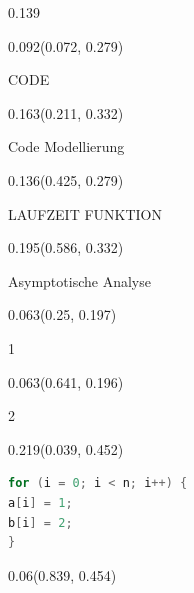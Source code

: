 \documentclass[aspectratio=169]{beamer}
\begin{document}
\begin{frame}[fragile]
\begin{textblock}{0.139}
\end{textblock}
\begin{textblock}{0.092}(0.072, 0.279)
  \begin{minipage}[t][0.161\paperheight]{\linewidth}
    \tiny
    CODE
  \end{minipage}
\end{textblock}
\begin{textblock}{0.163}(0.211, 0.332)
  \begin{minipage}[t][0.054\paperheight]{\linewidth}
    \tiny
    Code Modellierung
  \end{minipage}
\end{textblock}
\begin{textblock}{0.136}(0.425, 0.279)
  \begin{minipage}[t][0.161\paperheight]{\linewidth}
    \tiny
    LAUFZEIT FUNKTION
  \end{minipage}
\end{textblock}
\begin{textblock}{0.195}(0.586, 0.332)
  \begin{minipage}[t][0.054\paperheight3]{\linewidth}
    \small
    Asymptotische Analyse
  \end{minipage}
\end{textblock}
\begin{textblock}{0.063}(0.25, 0.197)
  \begin{minipage}[t][0.111\paperheight]{\linewidth}
    \tiny
    1
  \end{minipage}
\end{textblock}
\begin{textblock}{0.063}(0.641, 0.196)
  \begin{minipage}[t][0.111\paperheight]{\linewidth}
    \tiny
    2
  \end{minipage}
\end{textblock}
\begin{textblock}{0.219}(0.039, 0.452)
  \begin{minipage}[t][0.139\paperheight]{\linewidth}
    \begin{lstlisting}[language=Java, basicstyle=\ttfamily\scriptsize]
for (i = 0; i < n; i++) {
a[i] = 1;
b[i] = 2;
}
    \end{lstlisting}
  \end{minipage}
\end{textblock}
\begin{textblock}{0.06}(0.839, 0.454)
  \begin{minipage}[t][0.058\paperheight]{\linewidth}
    \tiny

\end{minipage}
\end{textblock}
\end{frame}
\end{document}
